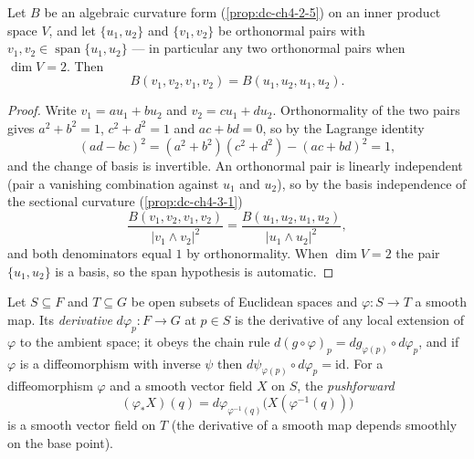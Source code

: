 \begin{lemma}
  \label{lem:dc-ch6-2-7-plane}
  \leanok
  Let $B$ be an algebraic curvature form (\cref{prop:dc-ch4-2-5}) on an inner
  product space $V$, and let $\{u_1,u_2\}$ and $\{v_1,v_2\}$ be orthonormal
  pairs with $v_1,v_2\in\operatorname{span}\{u_1,u_2\}$ — in particular any two
  orthonormal pairs when $\dim V=2$. Then
  $$
  B(v_1,v_2,v_1,v_2)=B(u_1,u_2,u_1,u_2).
  $$
\end{lemma}
\begin{proof}
  \leanok
  Write $v_1=au_1+bu_2$ and $v_2=cu_1+du_2$. Orthonormality of the two pairs
  gives $a^2+b^2=1$, $c^2+d^2=1$ and $ac+bd=0$, so by the Lagrange identity
  $$
  (ad-bc)^2=(a^2+b^2)(c^2+d^2)-(ac+bd)^2=1,
  $$
  and the change of basis is invertible. An orthonormal pair is linearly
  independent (pair a vanishing combination against $u_1$ and $u_2$), so by
  the basis independence of the sectional curvature (\cref{prop:dc-ch4-3-1})
  $$
  \frac{B(v_1,v_2,v_1,v_2)}{|v_1\wedge v_2|^2}
    =\frac{B(u_1,u_2,u_1,u_2)}{|u_1\wedge u_2|^2},
  $$
  and both denominators equal $1$ by orthonormality. When $\dim V=2$ the pair
  $\{u_1,u_2\}$ is a basis, so the span hypothesis is automatic.
\end{proof}

\begin{definition}
  \label{def:dc-ch6-2-7-pushforward}
  \leanok
  Let $S\subseteq F$ and $T\subseteq G$ be open subsets of Euclidean spaces and
  $\varphi:S\to T$ a smooth map. Its \emph{derivative} $d\varphi_p:F\to G$ at
  $p\in S$ is the derivative of any local extension of $\varphi$ to the
  ambient space; it obeys the chain rule
  $d(g\circ\varphi)_p=dg_{\varphi(p)}\circ d\varphi_p$, and if $\varphi$ is a
  diffeomorphism with inverse $\psi$ then
  $d\psi_{\varphi(p)}\circ d\varphi_p=\mathrm{id}$. For a diffeomorphism
  $\varphi$ and a smooth vector field $X$ on $S$, the \emph{pushforward}
  $$
  (\varphi_*X)(q)=d\varphi_{\varphi^{-1}(q)}\bigl(X(\varphi^{-1}(q))\bigr)
  $$
  is a smooth vector field on $T$ (the derivative of a smooth map depends
  smoothly on the base point).
\end{definition}


